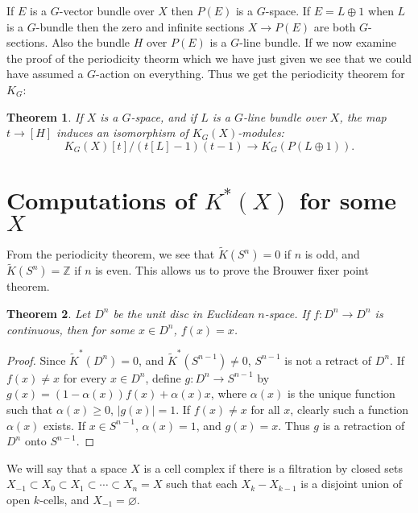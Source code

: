 \documentclass[leqno]{book}
\numberwithin{equation}{section}
\newtheorem{theorem}{Theorem}[section]%
\theoremstyle{definition}
\begin{document}
            If $E$ is a $G$-vector bundle over $X$ then $P(E)$ is a $G$-space. If $E=L\oplus 1$ when $L$ is a $G$-bundle then the zero and infinite sections $X\to P(E)$ are both $G$-sections. Also the bundle $H$ over $P(E)$ is a $G$-line bundle. If we now examine the proof of the periodicity theorm which we have just given we see that we could have assumed a $G$-action on everything. Thus we get the periodicity theorem for $K_{G}$:

            \begin{theorem}
              If $X$ is a $G$-space, and if $L$ is a $G$-line bundle over $X$, the map $t\to [H]$ induces an isomorphism of $K_{G}(X)$-modules:
              \begin{equation*}
                K_{G}(X)[t]/(t[L]-1)(t-1)\to K_{G}(P(L\oplus 1)).
              \end{equation*}
            \end{theorem}

        \section{Computations of $K^{*}(X)$ for some $X$}
            
            From the periodicity theorem, we see that $\tilde{K}(S^{n})= 0$ if $n$ is odd, and $\tilde{K}(S^{n})=\mathbb{Z}$ if $n$ is even. This allows us to prove the Brouwer fixer point theorem.

            \begin{theorem}
              Let $D^{n}$ be the unit disc in Euclidean $n$-space. If $f:D^{n}\to D^{n}$ is continuous, then for some $x\in D^{n}$, $f(x)=x$.
            \end{theorem}

            \begin{proof}
              Since $\tilde{K}^{*}(D^{n})=0$, and $\tilde{K}^{*}(S^{n-1})\neq 0$, $S^{n-1}$ is not a retract of $D^{n}$. If $f(x)\neq x$ for every $x\in D^{n}$, define $g:D^{n}\to S^{n-1}$ by $g(x)=(1-\alpha(x))f(x)+\alpha(x)x$, where $\alpha(x)$ is the unique function such that $\alpha(x)\ge 0$, $|g(x)|=1$. If $f(x)\neq x$ for all $x$, clearly such a function $\alpha(x)$ exists. If $x\in S^{n-1}$, $\alpha(x)=1$, and $g(x)=x$. Thus $g$ is a retraction of $D^{n}$ onto $S^{n-1}$.
            \end{proof}

            We will say that a space $X$ is a cell complex if there is a filtration by closed sets $X_{-1} \subset X_0 \subset X_1 \subset \cdots \subset X_{n}=X$ such that each $X_{k}-X_{k-1}$ is a disjoint union of open $k$-cells, and $X_{-1}=\varnothing$.
\end{document}
